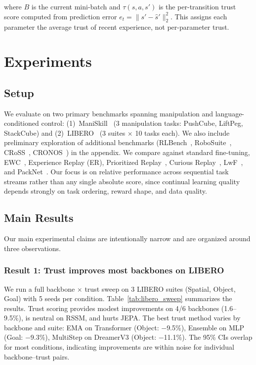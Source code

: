 \documentclass{article}
\begin{document}
where $B$ is the current mini-batch and $\tau(s, a, s')$ is the per-transition trust score computed from prediction error $e_t = \|s' - \hat{s}'\|_2^2$. This assigns each parameter the average trust of recent experience, not per-parameter trust.

\section{Experiments}

\subsection{Setup}

We evaluate on two primary benchmarks spanning manipulation and language-conditioned control: (1)~ManiSkill~\cite{maniskill2023} (3 manipulation tasks: PushCube, LiftPeg, StackCube) and (2)~LIBERO~\cite{libero2024} (3 suites $\times$ 10 tasks each). We also include preliminary exploration of additional benchmarks (RLBench~\cite{rlbench2020}, RoboSuite~\cite{robosuite2019}, CRoSS~\cite{cross2026}, CRONOS~\cite{cronos2024}) in the appendix. We compare against standard fine-tuning, EWC~\cite{kirkpatrick2017overcoming}, Experience Replay (ER), Prioritized Replay~\cite{schaul2016prioritized}, Curious Replay~\cite{de2020curious}, LwF~\cite{li2017learning}, and PackNet~\cite{mallya2018packnet}. Our focus is on relative performance across sequential task streams rather than any single absolute score, since continual learning quality depends strongly on task ordering, reward shape, and data quality.

\subsection{Main Results}

Our main experimental claims are intentionally narrow and are organized around three observations.

\subsubsection{Result 1: Trust improves most backbones on LIBERO}

We run a full backbone $\times$ trust sweep on 3 LIBERO suites (Spatial, Object, Goal) with 5 seeds per condition. Table~\ref{tab:libero_sweep} summarizes the results. Trust scoring provides modest improvements on 4/6 backbones (1.6--9.5\%), is neutral on RSSM, and hurts JEPA. The best trust method varies by backbone and suite: EMA on Transformer (Object: $-$9.5\%), Ensemble on MLP (Goal: $-$9.3\%), MultiStep on DreamerV3 (Object: $-$11.1\%). The 95\% CIs overlap for most conditions, indicating improvements are within noise for individual backbone--trust pairs.
\end{document}
